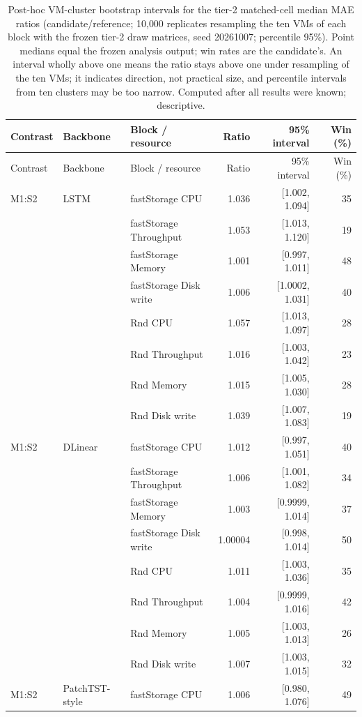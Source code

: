 \begin{longtable}{@{}lllrrr@{}}
\caption{Post-hoc VM-cluster bootstrap intervals for the tier-2 matched-cell median MAE ratios (candidate/reference; 10{,}000 replicates resampling the ten VMs of each block with the frozen tier-2 draw matrices, seed 20261007; percentile 95\%). Point medians equal the frozen analysis output; win rates are the candidate's. An interval wholly above one means the ratio stays above one under resampling of the ten VMs; it indicates direction, not practical size, and percentile intervals from ten clusters may be too narrow. Computed after all results were known; descriptive.}\label{tab:supp-median-intervals}\\
\toprule
Contrast & Backbone & Block / resource & Ratio & 95\% interval & Win (\%) \\
\midrule
\endfirsthead
\toprule
Contrast & Backbone & Block / resource & Ratio & 95\% interval & Win (\%) \\
\midrule
\endhead
M1:S2 & LSTM & fastStorage CPU & 1.036 & [1.002, 1.094] & 35 \\
 &  & fastStorage Throughput & 1.053 & [1.013, 1.120] & 19 \\
 &  & fastStorage Memory & 1.001 & [0.997, 1.011] & 48 \\
 &  & fastStorage Disk write & 1.006 & [1.0002, 1.031] & 40 \\
 &  & Rnd CPU & 1.057 & [1.013, 1.097] & 28 \\
 &  & Rnd Throughput & 1.016 & [1.003, 1.042] & 23 \\
 &  & Rnd Memory & 1.015 & [1.005, 1.030] & 28 \\
 &  & Rnd Disk write & 1.039 & [1.007, 1.083] & 19 \\
\addlinespace
M1:S2 & DLinear & fastStorage CPU & 1.012 & [0.997, 1.051] & 40 \\
 &  & fastStorage Throughput & 1.006 & [1.001, 1.082] & 34 \\
 &  & fastStorage Memory & 1.003 & [0.9999, 1.014] & 37 \\
 &  & fastStorage Disk write & 1.00004 & [0.998, 1.014] & 50 \\
 &  & Rnd CPU & 1.011 & [1.003, 1.036] & 35 \\
 &  & Rnd Throughput & 1.004 & [0.9999, 1.016] & 42 \\
 &  & Rnd Memory & 1.005 & [1.003, 1.013] & 26 \\
 &  & Rnd Disk write & 1.007 & [1.003, 1.015] & 32 \\
\addlinespace
M1:S2 & PatchTST-style & fastStorage CPU & 1.006 & [0.980, 1.076] & 49 \\

\end{longtable}
